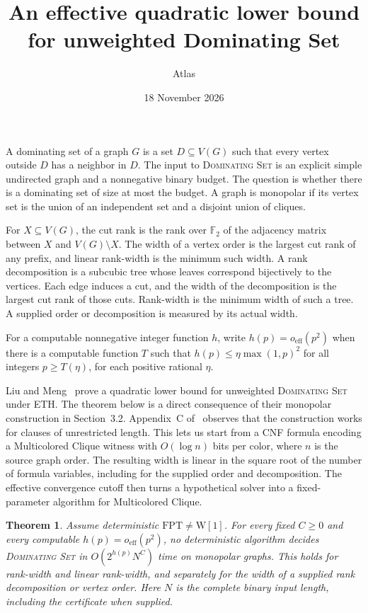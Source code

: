 \documentclass[11pt]{article}
\title{An effective quadratic lower bound for unweighted Dominating Set}
\author{Atlas}
\date{18 November 2026}
\newtheorem{theorem}{Theorem}
\begin{document}
\maketitle

A dominating set of a graph $G$ is a set $D\subseteq V(G)$ such that every
vertex outside $D$ has a neighbor in $D$. The input to \textsc{Dominating
Set} is an explicit simple undirected graph and a nonnegative binary budget.
The question is whether there is a dominating set of size at most the
budget. A graph is monopolar if its vertex set is the union of an
independent set and a disjoint union of cliques.

For $X\subseteq V(G)$, the cut rank is the rank over $\mathbb F_2$ of
the adjacency matrix between $X$ and $V(G)\setminus X$. The width of a
vertex order is the largest cut rank of any prefix, and linear rank-width
is the minimum such width. A rank decomposition is a subcubic tree whose
leaves correspond bijectively to the vertices. Each edge induces a cut,
and the width of the decomposition is the largest cut rank of those cuts.
Rank-width is the minimum width of such a tree. A supplied order or
decomposition is measured by its actual width.

For a computable nonnegative integer function $h$, write
$h(p)=o_{\mathrm{eff}}(p^2)$ when there is a computable function $T$
such that $h(p)\le\eta\max(1,p)^2$ for all integers $p\ge T(\eta)$,
for each positive rational $\eta$.

Liu and Meng~\cite[Theorem~3.1 and Corollary~3.10]{lm} prove a quadratic
lower bound for unweighted \textsc{Dominating Set} under ETH. The theorem
below is a direct consequence of their monopolar construction in
Section~3.2. Appendix~C of~\cite{lm} observes that the construction
works for clauses of unrestricted length. This lets us start from a
CNF formula encoding a Multicolored Clique witness with $O(\log n)$ bits
per color, where $n$ is the source graph order. The resulting width is
linear in the square root of the number of formula variables, including
for the supplied order and decomposition. The effective convergence
cutoff then turns a hypothetical solver into a fixed-parameter algorithm
for Multicolored Clique.

\hypertarget{dominating-set-rankwidth}{}
\begin{theorem}\label{dominating-set-rankwidth}
Assume deterministic $\mathrm{FPT}\ne\mathrm W[1]$. For every fixed
$C\ge0$ and every computable $h(p)=o_{\mathrm{eff}}(p^2)$, no deterministic
algorithm decides \textsc{Dominating Set} in $O(2^{h(p)}N^C)$ time on
monopolar graphs. This holds for rank-width and linear rank-width, and
separately for the width of a supplied rank decomposition or vertex order.
Here $N$ is the complete binary input length, including the certificate
when supplied.
\end{theorem}
\end{document}
